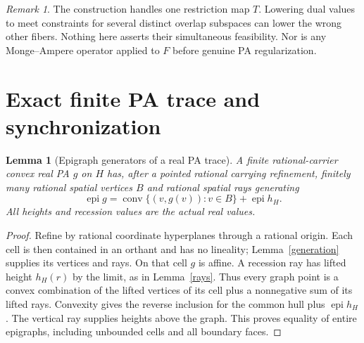 \documentclass[11pt]{article}
\newtheorem{lemma}[theorem]{Lemma}
\theoremstyle{definition}\newtheorem{definition}[theorem]{Definition}
\theoremstyle{remark}\newtheorem{remark}[theorem]{Remark}
\newcommand{\epi}{\operatorname{epi}}\newcommand{\conv}{\operatorname{conv}}\newcommand{\cone}{\operatorname{cone}}
\begin{document}
\begin{remark}
The construction handles one restriction map $T$. Lowering dual values to meet constraints for several distinct overlap subspaces can lower the wrong other fibers. Nothing here asserts their simultaneous feasibility. Nor is any Monge--Ampere operator applied to $F$ before genuine PA regularization.
\end{remark}

\section{Exact finite PA trace and synchronization}
\begin{lemma}[Epigraph generators of a real PA trace]\label{tracegenerators}
A finite rational-carrier convex real PA $g$ on $H$ has, after a pointed rational carrying refinement, finitely many rational spatial vertices $B$ and rational spatial rays generating
\[
\epi g=\conv\{(v,g(v)):v\in B\}+\epi h_H.
\]
All heights and recession values are the actual real values.
\end{lemma}
\begin{proof}
Refine by rational coordinate hyperplanes through a rational origin. Each cell is then contained in an orthant and has no lineality; Lemma~\ref{generation} supplies its vertices and rays. On that cell $g$ is affine. A recession ray has lifted height $h_H(r)$ by the limit, as in Lemma~\ref{rays}. Thus every graph point is a convex combination of the lifted vertices of its cell plus a nonnegative sum of its lifted rays. Convexity gives the reverse inclusion for the common hull plus $\epi h_H$. The vertical ray supplies heights above the graph. This proves equality of entire epigraphs, including unbounded cells and all boundary faces.
\end{proof}
\end{document}
